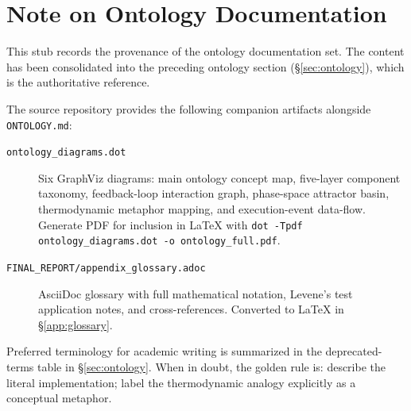 
\section*{Note on Ontology Documentation}

This stub records the provenance of the ontology documentation set.
The content has been consolidated into the preceding ontology section
(\S\ref{sec:ontology}), which is the authoritative reference.

The source repository provides the following companion artifacts alongside
\texttt{ONTOLOGY.md}:

\begin{description}
  \item[\texttt{ontology\_diagrams.dot}] Six GraphViz diagrams: main ontology
    concept map, five-layer component taxonomy, feedback-loop interaction
    graph, phase-space attractor basin, thermodynamic metaphor mapping, and
    execution-event data-flow. Generate PDF for inclusion in LaTeX with
    \texttt{dot -Tpdf ontology\_diagrams.dot -o ontology\_full.pdf}.

  \item[\texttt{FINAL\_REPORT/appendix\_glossary.adoc}] AsciiDoc glossary
    with full mathematical notation, Levene's test application notes, and
    cross-references. Converted to LaTeX in \S\ref{app:glossary}.
\end{description}

Preferred terminology for academic writing is summarized in the deprecated-
terms table in \S\ref{sec:ontology}. When in doubt, the golden rule is:
describe the literal implementation; label the thermodynamic analogy
explicitly as a conceptual metaphor.
